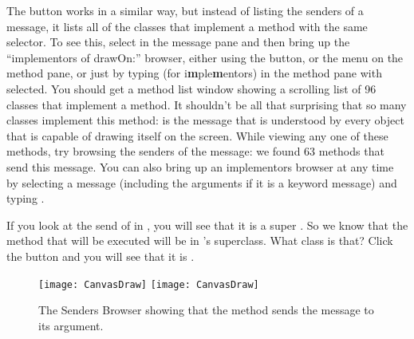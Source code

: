 \documentclass[a4paper,10pt,twoside]{book}
\begin{document}
The  button works in a similar way, but instead of listing the senders of a message, it lists all of the classes that implement a method with the same selector. To see this, select  in the message pane and then bring up the ``implementors of drawOn:'' browser, either using the  button, or the  menu on the method pane, or just by typing  (for {i\textbf{m}ple\textbf{m}entors}) in the method pane with  selected.  You should get a method list window showing a scrolling list of 96 classes that implement a  method.
It shouldn't be all that surprising that so many classes implement this method:  is the message that is understood by every object that is capable of drawing itself on the screen.  While viewing any one of these methods, try browsing the senders of the  message:  we found 63 methods that send this message.  You can also bring up an implementors browser at any time by selecting a message (including the arguments if it is a keyword message) and typing .


If you look at the send of  in , you will see that it is a super .  So we know that the method that will be executed will be in 's superclass.  What class is that?  Click the  button and you will see that it is . 

\begin{figure}[htbp]
	\begin{center}
   \ifluluelse
		{\texttt{[image: CanvasDraw]}}
		{\texttt{[image: CanvasDraw]}}
	\end{center}
	\caption{The Senders Browser showing that the  method sends the  message to its argument.	\label{fig:CanvasDraw}}
\end{figure}
\end{document}

